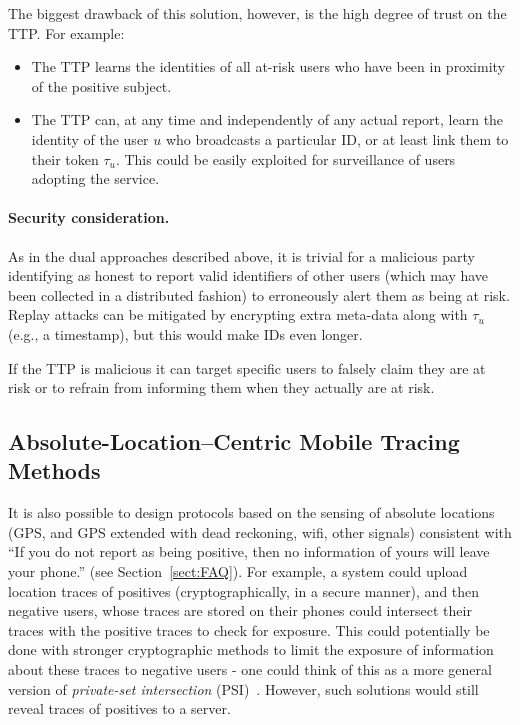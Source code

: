 \documentclass{article}
\begin{document}
The biggest drawback of this solution, however, is the high degree of trust on the TTP. For example:
\begin{itemize}
    \item The TTP learns the identities of all at-risk users who have been in proximity of the positive subject.  
    \item The TTP can, at any time and independently of any actual report, learn the identity of the user $u$ who broadcasts a particular ID, or at least link them to their token $\tau_u$. This could be easily exploited for surveillance of users adopting the service.
\end{itemize}

\paragraph{Security consideration.} As in the dual approaches described above, it is trivial for a malicious party identifying as honest to report valid identifiers of other users (which may have been collected in a distributed fashion) to erroneously alert them as being at risk. Replay attacks can be mitigated by encrypting extra meta-data along with $\tau_u$ (e.g., a timestamp), but this would make IDs even longer.

If the TTP is malicious it can target specific users to falsely claim they are at risk or to refrain from informing them when they actually are at risk.


\subsection{Absolute-Location--Centric Mobile Tracing Methods}\label{sect:GPS}
It is also possible to design protocols based on the sensing of absolute locations (GPS, and GPS extended with dead reckoning, wifi, other signals) consistent with ``If you do not report as being positive, then no information of yours will leave your phone.'' (see Section~\ref{sect:FAQ}).  For example, a system could upload location traces of positives (cryptographically, in a secure manner), and then negative users, whose traces are stored on their phones could intersect their traces with the positive traces to check for exposure. This could potentially be done with stronger cryptographic methods to limit the exposure of information about these traces to negative users - one could think of this as a more general version of {\em private-set intersection} (PSI)~\cite{PSI,PSI2,PSI3}. However, such solutions would still reveal traces of positives to a server.  
\end{document}
